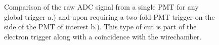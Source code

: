 \begin{figure}
  \centering
  \caption{Comparison of the raw ADC signal from a single PMT for any global trigger a.) and upon requiring a two-fold PMT trigger
    on the side of the PMT of interest b.). This type of cut is part of the electron trigger along with a coincidence with the wirechamber.}
  \label{fig:ADCsig}
\end{figure}

